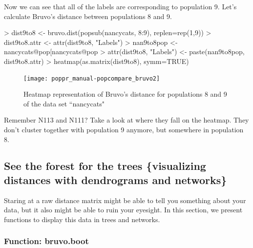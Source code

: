 \documentclass[letterpaper]{article}
\newcommand{\tab}{\hspace*{1em}}
\begin{document}
Now we can see that all of the labels are corresponding to population 9. Let's calculate Bruvo's distance between populations 8 and 9.
\begin{Schunk}
\begin{Sinput}
> dist9to8 <- bruvo.dist(popsub(nancycats, 8:9), replen=rep(1,9))
> dist9to8.attr <- attr(dist9to8, "Labels")
> nan9to8pop <- nancycats@pop[nancycats@pop %
> attr(dist9to8, "Labels") <- paste(nan9to8pop, dist9to8.attr)
> heatmap(as.matrix(dist9to8), symm=TRUE)
\end{Sinput}
\end{Schunk}
\begin{figure}[h!]
  \centering
  \caption{\footnotesize Heatmap representation of Bruvo's distance for populations 8 and 9 of the data set ``nancycats"}
  \label{bruvo_heat_map_8to9}
\texttt{[image: poppr\_manual-popcompare\_bruvo2]}
\end{figure}

Remember N113 and N111? Take a look at where they fall on the heatmap. They don't cluster together with population 9 anymore, but somewhere in population 8.

\subsection{See the forest for the trees \{visualizing distances with dendrograms and networks\}}\label{index:trees}

\tab\tab Staring at a raw distance matrix might be able to tell you something about your data, but it also might be able to ruin your eyesight. In this section, we present functions to display this data in trees and networks. 

\subsubsection{Function: bruvo.boot}\label{index:trees:bruvo.boot}
\end{document}
